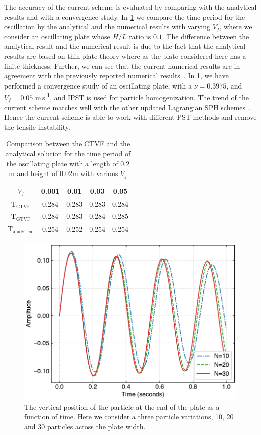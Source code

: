 The accuracy of the current scheme is evaluated by comparing with the
analytical results and with a convergence study. In
\cref{table:compare-analytical-with-simulated-h-l-0-1} we compare the time
period for the oscillation by the analytical and the numerical results with
varying $V_f$, where we consider an oscillating plate whose $H/L$ ratio is
$0.1$. The difference between the analytical result and the numerical result
is due to the fact that the analytical results are based on thin plate theory
where as the plate considered here has a finite thickness. Further, we can see
that the current numerical results are in agreement with the previously
reported numerical results~\citep{gray-ed-2001, zhang_hu_adams17}. In
\cref{fig:oscillating:ipst_convergence_plot}, we have performed a convergence
study of an oscillating plate, with a $\nu=0.3975$, and $V_f=0.05$
m\,s\textsuperscript{-1}, and IPST is used for particle homogenization. The trend of
the current scheme matches well with the other updated Lagrangian SPH
schemes~\citep{gray-ed-2001, zhang_hu_adams17}. Hence the current scheme is
able to work with different PST methods and remove the tensile instability.

\begin{table}[!htpb]
\centering
\begin{tabular}{c c c c c}
  \hline
  $V_f$ & 0.001 & 0.01 & 0.03 & 0.05 \\
  \hline
  $\text{T}_{\mathrm{CTVF}}$ & 0.284 & 0.283 & 0.283 & 0.284 \\
  $\text{T}_{\mathrm{GTVF}}$ & 0.284 & 0.283 & 0.284 & 0.285 \\
  $\text{T}_{\mathrm{analytical}}$ & 0.254 & 0.252 & 0.254 & 0.254
\end{tabular}
\caption{Comparison between the CTVF and the analytical solution for the time
  period of the oscillating plate with a length of $0.2$m and height of
  $0.02$m with various $V_f$}
\label{table:compare-analytical-with-simulated-h-l-0-1}
\end{table}
\begin{figure}
  \centering
  \includegraphics[width=0.7\columnwidth]{figures/ctvf/figures/oscillating_plate/ipst_convergence_plot}
  \caption{The vertical position of the particle at the end of the plate as a
    function of time. Here we consider a three particle variations, 10, 20 and
    30 particles across the plate width.}
\label{fig:oscillating:ipst_convergence_plot}
\end{figure}
%

